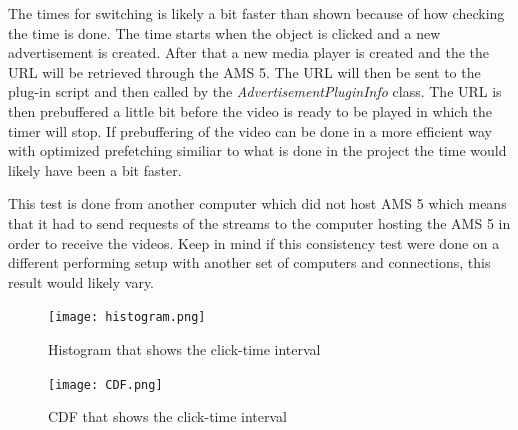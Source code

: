 The times for switching is likely a bit faster than shown because of how checking the time is done. The time starts when the object is clicked and a new advertisement is created. After that a new media player is created and the the URL will be retrieved through the AMS 5. The URL will then be sent to the plug-in script and then called by the \textit{AdvertisementPluginInfo} class. The URL is then prebuffered a little bit before the video is ready to be played in which the timer will stop. If prebuffering of the video can be done in a more efficient way with optimized prefetching similiar to what is done in the project \cite{optimizedstreaming} the time would likely have been a bit faster.

This test is done from another computer which did not host AMS 5 which means that it had to send requests of the streams to the computer hosting the AMS 5 in order to receive the videos. Keep in mind if this consistency test were done on a different performing setup with another set of computers and connections, this result would likely vary.

\newpage

\begin{figure}[ht!]
\begin{center}
	\texttt{[image: histogram.png]}
	\caption{Histogram that shows the click-time interval}
	\label{fig:histogram}
\end{center}
\end{figure}

\begin{figure}[ht!]
\begin{center}
	\texttt{[image: CDF.png]}
	\caption{CDF that shows the click-time interval}
	\label{fig:cdf}
\end{center}
\end{figure}